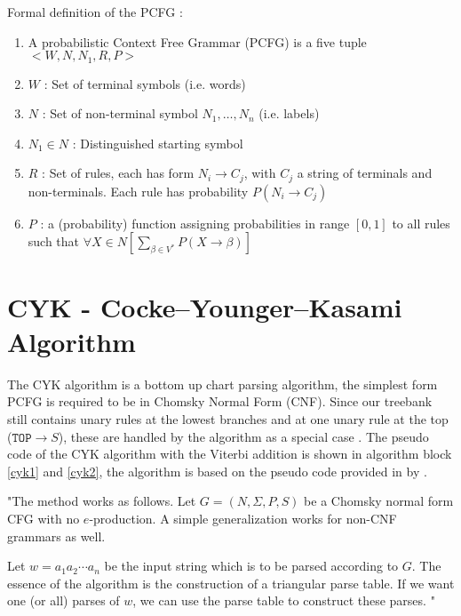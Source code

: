 \documentclass[11pt,twocolumn]{article}
\begin{document}
Formal definition of the PCFG \cite{slides2}:
\begin{enumerate}
\item A probabilistic Context Free Grammar (PCFG) is a five tuple $< W, N, N_1, R, P >$
\item $W$ : Set of terminal symbols (i.e. words)
\item $N$ : Set of non-terminal symbol $N_1, \ldots , N_n$ (i.e. labels)
\item $N_1 \in N$ : Distinguished starting symbol
\item $R$ : Set of rules, each has form $N_i \rightarrow C_j$, with $C_j$ a string of terminals and non-terminals. Each rule has probability $P (N_i \rightarrow C_j )$
\item $P$ : a (probability) function assigning probabilities in range $[0, 1]$ to all rules such that $\forall X \in N \left[ \sum_{\beta \in V^*} P (X \rightarrow \beta) \right]$
\end{enumerate}

\section{CYK - Cocke–Younger–Kasami Algorithm}
The CYK algorithm is a bottom up chart parsing algorithm, the simplest form PCFG is required to be in Chomsky Normal Form (CNF). Since our treebank still contains unary rules at the lowest branches and at one unary rule at the top ($\texttt{TOP} \rightarrow S$), these are handled by the algorithm as a special case \cite{slides3}. The pseudo code of the CYK algorithm with the Viterbi addition is shown in algorithm block \ref{cyk1} and \ref{cyk2}, the algorithm is based on the pseudo code provided in by \cite{ss}.

"The method works as follows. Let $G = (N, \Sigma , P, S)$ be a Chomsky normal form CFG with no $e$-production. A simple generalization works for non-CNF grammars as well. 

Let $w = a_1 a_2 \cdots a_n$ be the input string which is to be parsed according to $G$. The essence of the algorithm is the construction of a triangular parse table. If we want one (or all) parses of $w$, we can use the parse table to construct these parses. \cite{cyk}"
\end{document}
